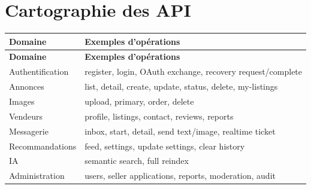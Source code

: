 \appendix

\chapter{Cartographie des API}

{\small\singlespacing{}
\begin{longtable}{|>{\raggedright\arraybackslash}p{}|>{\raggedright\arraybackslash}p{}|}
\hline
\rowcolor{tablehead} \color{white}\bfseries Domaine & \color{white}\bfseries Exemples d'opérations \\ \hline
\endfirsthead
\rowcolor{tablehead} \color{white}\bfseries Domaine & \color{white}\bfseries Exemples d'opérations \\ \hline
\endhead
\hline\endfoot
Authentification & register, login, OAuth exchange, recovery request/complete \\ \hline
\rowcolor{tablerow} Annonces & list, detail, create, update, status, delete, my-listings \\ \hline
Images & upload, primary, order, delete \\ \hline
\rowcolor{tablerow} Vendeurs & profile, listings, contact, reviews, reports \\ \hline
Messagerie & inbox, start, detail, send text/image, realtime ticket \\ \hline
\rowcolor{tablerow} Recommandations & feed, settings, update settings, clear history \\ \hline
IA & semantic search, full reindex \\ \hline
\rowcolor{tablerow} Administration & users, seller applications, reports, moderation, audit \\ \hline
\end{longtable}
}
